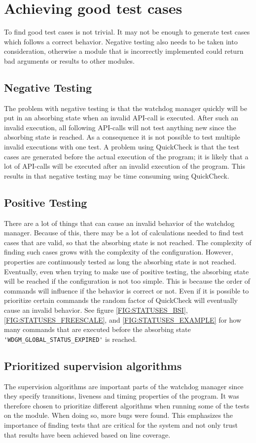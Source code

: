 \section{Achieving good test cases}
To find good test cases is not trivial. It may not be enough to
generate test cases which follows a correct behavior. Negative testing
also needs to be taken into consideration, otherwise a module that is
incorrectly implemented could return bad arguments or results to other
modules.

\subsection{Negative Testing}
The problem with negative testing is that the watchdog manager quickly
will be put in an absorbing state when an invalid API-call is
executed. After such an invalid execution, all following API-calls
will not test anything new since the absorbing state is reached. As a
consequence it is not possible to test multiple invalid executions
with one test. A problem using QuickCheck is that the test cases are
generated before the actual execution of the program; it is likely
that a lot of API-calls will be executed after an invalid execution of
the program. This results in that negative testing may be time
consuming using QuickCheck.

\subsection{Positive Testing}
There are a lot of things that can cause an invalid behavior of the
watchdog manager. Because of this, there may be a lot of calculations
needed to find test cases that are valid, so that the absorbing state
is not reached. The complexity of finding such cases grows with the
complexity of the configuration. However, properties are continuously
tested as long the absorbing state is not reached. Eventually, even
when trying to make use of positive testing, the absorbing state will
be reached if the configuration is not too simple. This is because the
order of commands will influence if the behavior is correct or
not. Even if it is possible to prioritize certain commands the random
factor of QuickCheck will eventually cause an invalid behavior. See
figure \ref{FIG:STATUSES_BSI}, \ref{FIG:STATUSES_FREESCALE}, and
\ref{FIG:STATUSES_EXAMPLE} for how many commands that are executed
before the absorbing state \lstinline!'WDGM_GLOBAL_STATUS_EXPIRED'! is
reached.

\subsection{Prioritized supervision algorithms}
The supervision algorithms are important parts of the watchdog manager
since they specify transitions, liveness and timing properties of the
program. It was therefore chosen to prioritize different algorithms
when running some of the tests on the module. When doing so, more bugs
were found. This emphasizes the importance of finding tests that are
critical for the system and not only trust that results have been achieved
based on line coverage.

